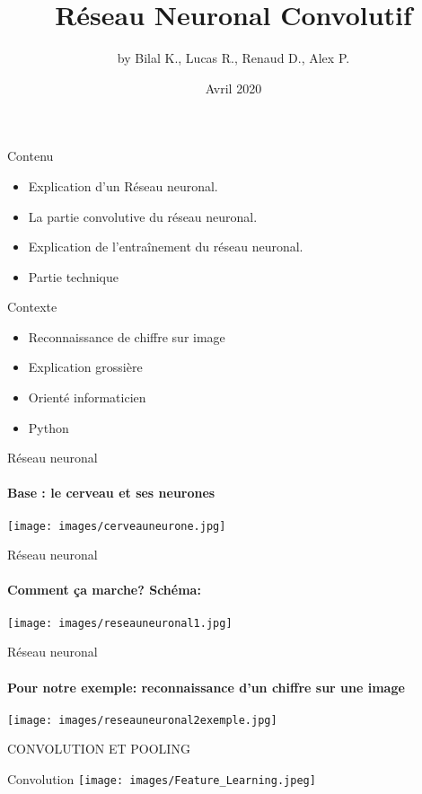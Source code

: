 \documentclass{beamer}
\title{Réseau Neuronal Convolutif}
\author{by Bilal K., Lucas R., Renaud D., Alex P. }
\date{Avril 2020}
\begin{document}
\maketitle
\begin{frame}{Contenu}
    \begin{itemize}
        \item Explication d'un Réseau neuronal.
        \item La partie convolutive du réseau neuronal.
        \item Explication de l'entraînement du réseau neuronal.
        \item Partie technique
    \end{itemize}
\end{frame}
\begin{frame}{Contexte}
    \begin{itemize}
        \item Reconnaissance de chiffre sur image
        \item Explication grossière
        \item Orienté informaticien 
        \item Python
    \end{itemize}
\end{frame}
\begin{frame}{Réseau neuronal}
    \framesubtitle{Base : le cerveau et ses neurones}
        \texttt{[image: images/cerveauneurone.jpg]}
        \centering
\end{frame}
\begin{frame}{Réseau neuronal}
    \framesubtitle{Comment ça marche? Schéma:}
        \texttt{[image: images/reseauneuronal1.jpg]}
        \centering
\end{frame}
\begin{frame}{Réseau neuronal}
    \framesubtitle{Pour notre exemple: reconnaissance d'un chiffre sur une image}
        \texttt{[image: images/reseauneuronal2exemple.jpg]}
        \centering
\end{frame}




\begin{frame}
\huge{\centerline{CONVOLUTION ET POOLING}}
\end{frame}


\begin{frame}{Convolution}
    \texttt{[image: images/Feature\_Learning.jpeg]}
\end{frame}
\end{document}

